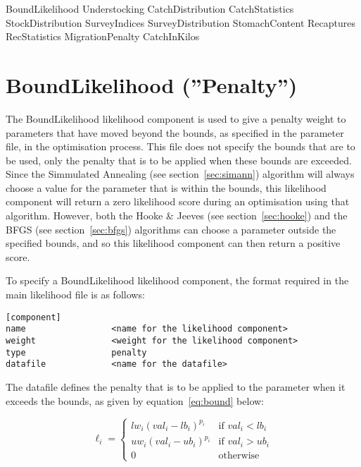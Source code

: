 \documentclass[10pt,twoside]{book}
\begin{document}
\bigskip
BoundLikelihood\newline
Understocking\newline
CatchDistribution\newline
CatchStatistics\newline
StockDistribution\newline
SurveyIndices\newline
SurveyDistribution\newline
StomachContent\newline
Recaptures\newline
RecStatistics\newline
MigrationPenalty\newline
CatchInKilos

\section{BoundLikelihood (''Penalty'')}\label{sec:boundlike}
The BoundLikelihood likelihood component is used to give a penalty weight to parameters that have moved beyond the bounds, as specified in the parameter file, in the optimisation process.  This file does not specify the bounds that are to be used, only the penalty that is to be applied when these bounds are exceeded.  Since the Simmulated Annealing (see section~\ref{sec:simann}) algorithm will always choose a value for the parameter that is within the bounds, this likelihood component will return a zero likelihood score during an optimisation using that algorithm.  However, both the Hooke \& Jeeves (see section~\ref{sec:hooke}) and the BFGS (see section~\ref{sec:bfgs}) algorithms can choose a parameter outside the specified bounds, and so this likelihood component can then return a positive score.

\bigskip
To specify a BoundLikelihood likelihood component, the format required in the main likelihood file is as follows:

{\small\begin{verbatim}
[component]
name                 <name for the likelihood component>
weight               <weight for the likelihood component>
type                 penalty
datafile             <name for the datafile>
\end{verbatim}}

The datafile defines the penalty that is to be applied to the parameter when it exceeds the bounds, as given by equation~\ref{eq:bound} below:

\begin{equation}\label{eq:bound}
\ell_{i} =
\begin{cases}
lw_{i} (val_{i} - lb_{i})^{p_{i}} & \textrm{if $val_{i} < lb_i$} \\
uw_{i} (val_{i} - ub_{i})^{p_{i}} & \textrm{if $val_{i} > ub_i$} \\
0 & \textrm{otherwise}
\end{cases}
\end{equation}
\end{document}

